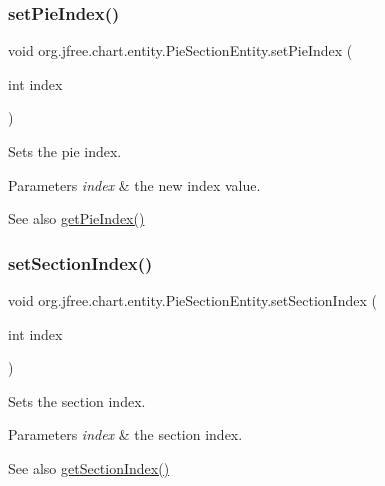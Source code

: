 \subsubsection{\texorpdfstring{set\+Pie\+Index()}{setPieIndex()}}
{\footnotesize\ttfamily void org.\+jfree.\+chart.\+entity.\+Pie\+Section\+Entity.\+set\+Pie\+Index (\begin{DoxyParamCaption}\item[{int}]{index }\end{DoxyParamCaption})}

Sets the pie index.


\begin{DoxyParams}{Parameters}
{\em index} & the new index value.\\
\hline
\end{DoxyParams}
\begin{DoxySeeAlso}{See also}
\mbox{\hyperlink{classorg_1_1jfree_1_1chart_1_1entity_1_1_pie_section_entity_a07ea4f8cc4f44a495c95ae2e594bc5ff}{get\+Pie\+Index()}} 
\end{DoxySeeAlso}
\mbox{\label{classorg_1_1jfree_1_1chart_1_1entity_1_1_pie_section_entity_a006645185ce6fea9502b49b823431307}} 
\subsubsection{\texorpdfstring{set\+Section\+Index()}{setSectionIndex()}}
{\footnotesize\ttfamily void org.\+jfree.\+chart.\+entity.\+Pie\+Section\+Entity.\+set\+Section\+Index (\begin{DoxyParamCaption}\item[{int}]{index }\end{DoxyParamCaption})}

Sets the section index.


\begin{DoxyParams}{Parameters}
{\em index} & the section index.\\
\hline
\end{DoxyParams}
\begin{DoxySeeAlso}{See also}
\mbox{\hyperlink{classorg_1_1jfree_1_1chart_1_1entity_1_1_pie_section_entity_a86999ad37a7b6db83350f9b1f6abd8a7}{get\+Section\+Index()}} 
\end{DoxySeeAlso}
\mbox{\label{classorg_1_1jfree_1_1chart_1_1entity_1_1_pie_section_entity_af1335031bd29163a4d65ee4e02a044cd}} 
